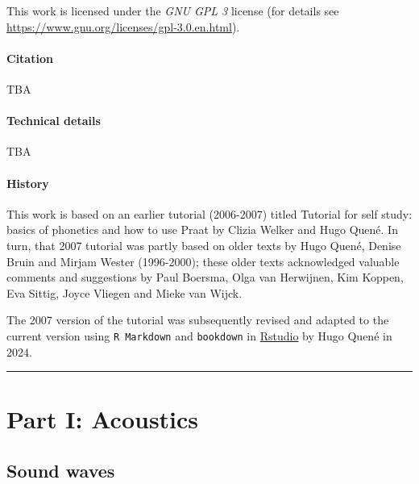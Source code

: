 \documentclass[
]{book}
\begin{document}
This work is licensed under the \emph{GNU GPL 3} license (for details see
\url{https://www.gnu.org/licenses/gpl-3.0.en.html}).

\subsection*{Citation}\label{citation}

TBA

\subsection*{Technical details}\label{technical-details}

TBA

\subsection*{History}\label{history}

This work is based on an earlier tutorial (2006-2007) titled Tutorial for self study: basics of phonetics and how to use Praat by Clizia Welker and Hugo Quené. In turn, that 2007 tutorial was partly based on older texts by Hugo Quené, Denise Bruin and Mirjam Wester (1996-2000); these older texts acknowledged valuable comments and suggestions by Paul Boersma, Olga van Herwijnen, Kim Koppen, Eva Sittig, Joyce Vliegen and Mieke van Wijck.

The 2007 version of the tutorial was subsequently revised and adapted to the current version using \texttt{R\ Markdown} \citep{rmarkdown2018} and \texttt{bookdown} \citep{R-bookdown} in \href{https://www.rstudio.com}{Rstudio} by Hugo Quené in 2024.

\begin{center}\rule{0.5\linewidth}{0.5pt}\end{center}

\part*{Part I: Acoustics}\label{part-part-i-acoustics}

\chapter{Sound waves}\label{ch-soundwaves}
\end{document}
